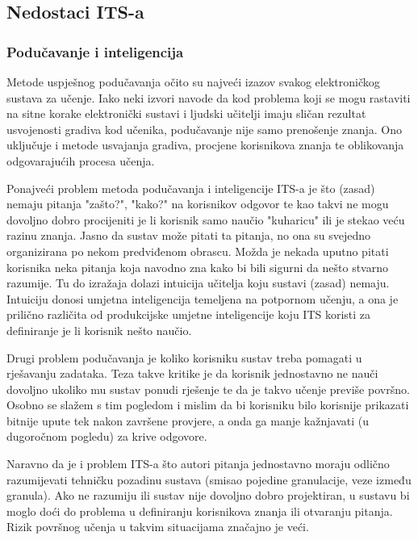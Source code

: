 \documentclass[times, utf8, zavrsni, numeric]{fer}
\begin{document}
\subsection{Nedostaci ITS-a}

\subsubsection{Podučavanje i inteligencija}
Metode uspješnog podučavanja očito su najveći izazov svakog elektroničkog sustava za učenje. Iako neki izvori navode da kod problema koji se mogu rastaviti na sitne korake elektronički sustavi i ljudski učitelji imaju sličan rezultat usvojenosti gradiva kod učenika, podučavanje nije samo prenošenje znanja. Ono uključuje i metode usvajanja gradiva, procjene korisnikova znanja te oblikovanja odgovarajućih procesa učenja.
\par
Ponajveći problem metoda podučavanja i inteligencije ITS-a je što (zasad) nemaju pitanja "zašto?", "kako?" na korisnikov odgovor te kao takvi ne mogu dovoljno dobro procijeniti je li korisnik samo naučio "kuharicu" ili je stekao veću razinu znanja. Jasno da sustav može pitati ta pitanja, no ona su svejedno organizirana po nekom predviđenom obrascu. Možda je nekada uputno pitati korisnika neka pitanja koja navodno zna kako bi bili sigurni da nešto stvarno razumije. Tu do izražaja dolazi intuicija učitelja koju sustavi (zasad) nemaju. Intuiciju donosi umjetna inteligencija temeljena na potpornom učenju, a ona je prilično različita od produkcijske umjetne inteligencije koju ITS koristi za definiranje je li korisnik nešto naučio.
\par
Drugi problem podučavanja je koliko korisniku sustav treba pomagati u rješavanju zadataka. Teza takve kritike je da korisnik jednostavno ne nauči dovoljno ukoliko mu sustav ponudi rješenje te da je takvo učenje previše površno. Osobno se slažem s tim pogledom i mislim da bi korisniku bilo korisnije prikazati bitnije upute tek nakon završene provjere, a onda ga manje kažnjavati (u dugoročnom pogledu) za krive odgovore.\citep{limitations}
\par
Naravno da je i problem ITS-a što autori pitanja jednostavno moraju odlično razumijevati tehničku pozadinu sustava (smisao pojedine granulacije, veze između granula). Ako ne razumiju ili sustav nije dovoljno dobro projektiran, u sustavu bi moglo doći do problema u definiranju korisnikova znanja ili otvaranju pitanja. Rizik površnog učenja u takvim situacijama značajno je veći.
\end{document}
